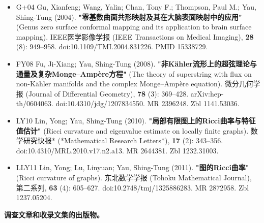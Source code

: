 \begin{itemize}
\item G+04 Gu, Xianfeng; Wang, Yalin; Chan, Tony F.; Thompson, Paul M.; Yau, Shing-Tung (2004). \textbf{"零基数曲面共形映射及其在大脑表面映射中的应用"} (Genus zero surface conformal mapping and its application to brain surface mapping). IEEE医学影像学报 (IEEE Transactions on Medical Imaging), \textbf{28} (8): 949–958. doi:10.1109/TMI.2004.831226. PMID 15338729.
\item FY08 Fu, Ji-Xiang; Yau, Shing-Tung (2008). \textbf{"非Kähler流形上的超弦理论与通量及复杂Monge–Ampère方程"} (The theory of superstring with flux on non-Kähler manifolds and the complex Monge–Ampère equation). 微分几何学报 (Journal of Differential Geometry), \textbf{78} (3): 369–428. arXiv:hep-th/0604063. doi:10.4310/jdg/1207834550. MR 2396248. Zbl 1141.53036.
\item LY10 Lin, Yong; Yau, Shing-Tung (2010). \textbf{"局部有限图上的Ricci曲率与特征值估计"} (Ricci curvature and eigenvalue estimate on locally finite graphs). 数学研究快报* (*Mathematical Research Letters*), \textbf{17} (2): 343–356. doi:10.4310/MRL.2010.v17.n2.a13. MR 2644381. Zbl 1232.31003.
\item LLY11 Lin, Yong; Lu, Linyuan; Yau, Shing-Tung (2011). \textbf{"图的Ricci曲率"} (Ricci curvature of graphs). 东北数学学报 (Tohoku Mathematical Journal), 第二系列, \textbf{63} (4): 605–627. doi:10.2748/tmj/1325886283. MR 2872958. Zbl 1237.05204.
\end{itemize}
\textbf{调查文章和收录文集的出版物。}

